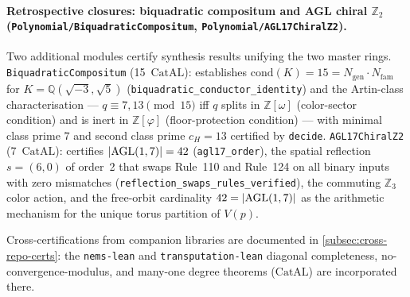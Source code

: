 \documentclass[11pt,a4paper]{article}
\theoremstyle{definition}
\newcommand{\CatAL}{\ensuremath{\mathrm{CatAL}}}
\begin{document}
\paragraph{Retrospective closures: biquadratic compositum and AGL chiral
  $\mathbb{Z}_2$
  (\texttt{Polynomial/\allowbreak BiquadraticCompositum},
   \texttt{Polynomial/\allowbreak AGL17ChiralZ2}).}
Two additional modules certify synthesis results unifying the two master
rings.
\texttt{BiquadraticCompositum} (15~\CatAL): establishes
$\mathrm{cond}(K)=15=N_{\mathrm{gen}}\cdot N_{\mathrm{fam}}$ for
$K=\mathbb{Q}(\sqrt{-3},\sqrt{5})$ (\texttt{biquadratic\_conductor\_identity})
and the Artin-class characterisation --- $q\equiv 7,13\pmod{15}$ iff $q$
splits in $\mathbb{Z}[\omega]$ (color-sector condition) and is inert in
$\mathbb{Z}[\varphi]$ (floor-protection condition) --- with minimal class
prime $7$ and second class prime $c_H=13$ certified by \texttt{decide}.
\texttt{AGL17ChiralZ2} (7~\CatAL): certifies $|{\rm AGL}(1,7)|=42$
(\texttt{agl17\_order}), the spatial reflection $s=(6,0)$ of order~2 that
swaps Rule~110 and Rule~124 on all binary inputs with zero mismatches
(\texttt{reflection\_swaps\_rules\_verified}), the commuting $\mathbb{Z}_3$
color action, and the free-orbit cardinality $42=|{\rm AGL}(1,7)|$ as the
arithmetic mechanism for the unique torus partition of $V(p)$.

Cross-certifications from companion libraries are documented in
\cref{subsec:cross-repo-certs}: the \texttt{nems-lean} and
\texttt{transputation-lean} diagonal completeness, no-convergence-modulus,
and many-one degree theorems (\CatAL) are incorporated there.
\end{document}
